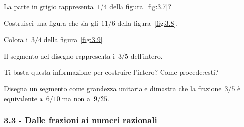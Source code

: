  \begin{esercizio}
 \label{ese:3.17}
La parte in grigio rappresenta~$1/4$ della figura~\ref{fig:3.7}?
\end{esercizio}

\begin{esercizio}
\label{ese:3.18}
 Costruisci una figura che sia gli~$11/6$ della figura~\ref{fig:3.8}.
\end{esercizio}

\begin{esercizio}
\label{ese:3.19}
Colora i~$3/4$ della figura~\ref{fig:3.9}.
\end{esercizio}

\begin{esercizio}
 \label{ese:3.20}
Il segmento nel disegno rappresenta i~$3/5$ dell'intero.
 \begin{center}
 
 \end{center}
Ti basta questa informazione per costruire l'intero? Come procederesti?
\end{esercizio}

\begin{esercizio}
 \label{ese:3.21}
Disegna un segmento come grandezza unitaria e dimostra che la frazione~$3/5$ è equivalente a~$6/10$ ma non a~$9/25$.
% 
\end{esercizio}


\subsubsection*{3.3 - Dalle frazioni ai numeri razionali}

%

